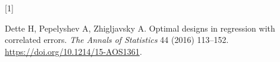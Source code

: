 \documentclass[
  11pt,
]{article}
\newlength{\cslhangindent}
\newlength{\csllabelwidth}
\newenvironment{CSLReferences}[2] %
 {\begin{list}{}{%
  \setlength{\itemindent}{0pt}
  \setlength{\leftmargin}{0pt}
  \setlength{\parsep}{0pt}
  \ifodd #1
   \setlength{\leftmargin}{\cslhangindent}
   \setlength{\itemindent}{-1\cslhangindent}
  \fi
  \setlength{\itemsep}{#2\baselineskip}}}
 {\end{list}}
\newcommand{\CSLLeftMargin}[1]{\parbox[t]{\csllabelwidth}{\strut#1\strut}}
\newcommand{\CSLRightInline}[1]{\parbox[t]{\linewidth - \csllabelwidth}{\strut#1\strut}}
\begin{document}
\protect{}\label{refs}
\begin{CSLReferences}{0}{0}
\CSLLeftMargin{{[}1{]} }%
\CSLRightInline{Dette H, Pepelyshev A, Zhigljavsky A. Optimal designs in
regression with correlated errors. \emph{The Annals of Statistics} 44
(2016) 113--152. \url{https://doi.org/10.1214/15-AOS1361}.}

\end{CSLReferences}
\end{document}
